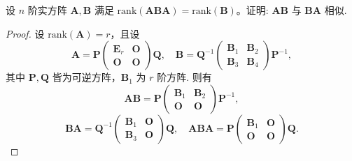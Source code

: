 \documentclass[../../main.tex]{subfiles}
\begin{document}
\begin{example}
设 \( n \) 阶实方阵 \( \boldsymbol{A},\boldsymbol{B} \) 满足 \( \mathrm{rank}(\boldsymbol{ABA}) = \mathrm{rank}(\boldsymbol{B}) \)。证明: \( \boldsymbol{AB} \) 与 \( \boldsymbol{BA} \) 相似.
\end{example}
\begin{proof}
设 \( \mathrm{rank}(\boldsymbol{A}) = r \)，且设
\[
\boldsymbol{A} = \boldsymbol{P} \begin{pmatrix} \boldsymbol{E}_r & \boldsymbol{O} \\ \boldsymbol{O} & \boldsymbol{O} \end{pmatrix} \boldsymbol{Q}, \quad \boldsymbol{B} = \boldsymbol{Q}^{-1} \begin{pmatrix} \boldsymbol{B}_1 & \boldsymbol{B}_2 \\ \boldsymbol{B}_3 & \boldsymbol{B}_4 \end{pmatrix} \boldsymbol{P}^{-1},
\]
其中 \( \boldsymbol{P},\boldsymbol{Q} \) 皆为可逆方阵，\( \boldsymbol{B}_1 \) 为 \( r \) 阶方阵. 则有
\[
\boldsymbol{AB} = \boldsymbol{P} \begin{pmatrix} \boldsymbol{B}_1 & \boldsymbol{B}_2 \\ \boldsymbol{O} & \boldsymbol{O} \end{pmatrix} \boldsymbol{P}^{-1},
\]
\[
\boldsymbol{BA} = \boldsymbol{Q}^{-1} \begin{pmatrix} \boldsymbol{B}_1 & \boldsymbol{O} \\ \boldsymbol{B}_3 & \boldsymbol{O} \end{pmatrix} \boldsymbol{Q}, \quad \boldsymbol{ABA} = \boldsymbol{P} \begin{pmatrix} \boldsymbol{B}_1 & \boldsymbol{O} \\ \boldsymbol{O} & \boldsymbol{O} \end{pmatrix} \boldsymbol{Q}.
\]


\end{proof}
\end{document}
